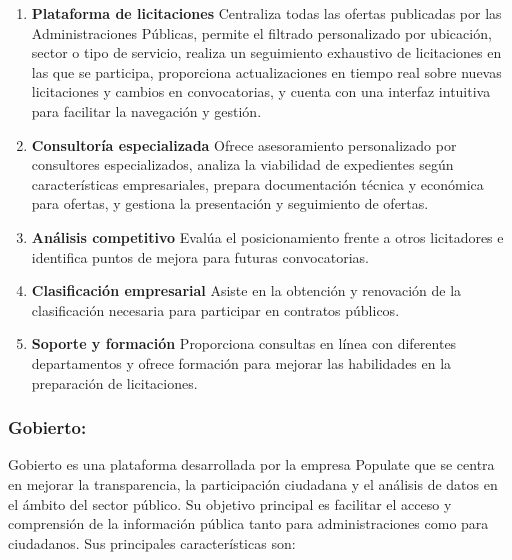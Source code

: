 \documentclass{article}
\begin{document}
\begin{enumerate}
    \item \textbf{Plataforma de licitaciones}
    \newline
    Centraliza todas las ofertas publicadas por las Administraciones Públicas, permite el filtrado personalizado por ubicación, sector o tipo de servicio, realiza un seguimiento exhaustivo de licitaciones en las que se participa, proporciona actualizaciones en tiempo real sobre nuevas licitaciones y cambios en convocatorias, y cuenta con una interfaz intuitiva para facilitar la navegación y gestión.

    \item \textbf{Consultoría especializada}  
    \newline
    Ofrece asesoramiento personalizado por consultores especializados, analiza la viabilidad de expedientes según características empresariales, prepara documentación técnica y económica para ofertas, y gestiona la presentación y seguimiento de ofertas.
    
    \item \textbf{Análisis competitivo}  
    \newline
    Evalúa el posicionamiento frente a otros licitadores e identifica puntos de mejora para futuras convocatorias.
    
    \item \textbf{Clasificación empresarial}  
    \newline
    Asiste en la obtención y renovación de la clasificación necesaria para participar en contratos públicos.
    
    \item \textbf{Soporte y formación}  
    \newline
    Proporciona consultas en línea con diferentes departamentos y ofrece formación para mejorar las habilidades en la preparación de licitaciones.
\end{enumerate}

\subsubsection{Gobierto:} 
Gobierto es una plataforma desarrollada por la empresa Populate que se centra en mejorar la transparencia, la participación ciudadana y el análisis de datos en el ámbito del sector público. Su objetivo principal es facilitar el acceso y comprensión de la información pública tanto para administraciones como para ciudadanos. Sus principales características son:
\end{document}
